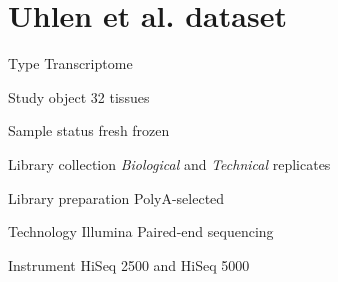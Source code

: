 \chapter{Uhlen et al. dataset}
\label{ch:uhlenData}

\begin{eqlist}
    \item[Type] Transcriptome
    \item[Study object] 32 tissues
    \item[Sample status] fresh frozen
    \item[Library collection] \emph{Biological} and \emph{Technical} replicates
    \item[Library preparation] PolyA-selected
    \item[Technology] Illumina Paired-end sequencing
    \item[Instrument] HiSeq 2500 and HiSeq 5000
\end{eqlist}


